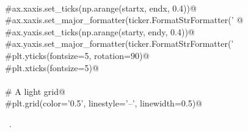 \documentclass[12pt, english, oneside]{report}
\begin{document}
\begin{appendices}
\begin{flushleft}
\begin{list}{}{}
\mbox{}\verb@@\\
\mbox{}\verb@    #ax.xaxis.set_ticks(np.arange(startx, endx, 0.4))@\\
\mbox{}\verb@    #ax.xaxis.set_major_formatter(ticker.FormatStrFormatter('%0.1f'))@\\
\mbox{}\verb@     @\\
\mbox{}\verb@    #ax.yaxis.set_ticks(np.arange(starty, endy, 0.4))@\\
\mbox{}\verb@    #ax.yaxis.set_major_formatter(ticker.FormatStrFormatter('%0.1f'))@\\
\mbox{}\verb@@\\
\mbox{}\verb@    #plt.yticks(fontsize=5, rotation=90)@\\
\mbox{}\verb@    #plt.xticks(fontsize=5)@\\
\mbox{}\verb@@\\
\mbox{}\verb@    # A light grid@\\
\mbox{}\verb@    #plt.grid(color='0.5', linestyle='--', linewidth=0.5)@\\
\mbox{}\verb@@{\NWsep}
\end{list}
\vspace{-1.5ex}
\footnotesize
\begin{list}{}{\setlength{\itemsep}{-\parsep}\setlength{\itemindent}{-\leftmargin}}
\item \NWtxtMacroRefIn\ .

\item{}
\end{list}
\vspace{4ex}
\end{flushleft}





\end{appendices}
\listoftodos
\end{document}
